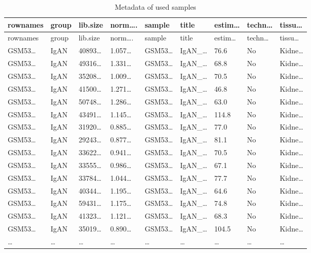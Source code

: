 \documentclass[
]{article}
\begin{document}
\begin{longtable}[]{@{}lllllllll@{}}
\caption{\label{tab:metadata-of-used-samples}Metadata of used samples}\tabularnewline
\toprule
rownames & group & lib.size & norm\ldots. & sample & title & estim\ldots{} & techn\ldots{} & tissu\ldots{}\tabularnewline
\midrule
\endfirsthead
\toprule
rownames & group & lib.size & norm\ldots. & sample & title & estim\ldots{} & techn\ldots{} & tissu\ldots{}\tabularnewline
\midrule
\endhead
GSM53\ldots{} & IgAN & 40893\ldots{} & 1.057\ldots{} & GSM53\ldots{} & IgAN\_\ldots{} & 76.6 & No & Kidne\ldots{}\tabularnewline
GSM53\ldots{} & IgAN & 49316\ldots{} & 1.331\ldots{} & GSM53\ldots{} & IgAN\_\ldots{} & 68.8 & No & Kidne\ldots{}\tabularnewline
GSM53\ldots{} & IgAN & 35208\ldots{} & 1.009\ldots{} & GSM53\ldots{} & IgAN\_\ldots{} & 70.5 & No & Kidne\ldots{}\tabularnewline
GSM53\ldots{} & IgAN & 41500\ldots{} & 1.271\ldots{} & GSM53\ldots{} & IgAN\_\ldots{} & 46.8 & No & Kidne\ldots{}\tabularnewline
GSM53\ldots{} & IgAN & 50748\ldots{} & 1.286\ldots{} & GSM53\ldots{} & IgAN\_\ldots{} & 63.0 & No & Kidne\ldots{}\tabularnewline
GSM53\ldots{} & IgAN & 43491\ldots{} & 1.145\ldots{} & GSM53\ldots{} & IgAN\_\ldots{} & 114.8 & No & Kidne\ldots{}\tabularnewline
GSM53\ldots{} & IgAN & 31920\ldots{} & 0.885\ldots{} & GSM53\ldots{} & IgAN\_\ldots{} & 77.0 & No & Kidne\ldots{}\tabularnewline
GSM53\ldots{} & IgAN & 29243\ldots{} & 0.877\ldots{} & GSM53\ldots{} & IgAN\_\ldots{} & 81.1 & No & Kidne\ldots{}\tabularnewline
GSM53\ldots{} & IgAN & 33622\ldots{} & 0.941\ldots{} & GSM53\ldots{} & IgAN\_\ldots{} & 70.5 & No & Kidne\ldots{}\tabularnewline
GSM53\ldots{} & IgAN & 33555\ldots{} & 0.986\ldots{} & GSM53\ldots{} & IgAN\_\ldots{} & 67.1 & No & Kidne\ldots{}\tabularnewline
GSM53\ldots{} & IgAN & 33784\ldots{} & 1.044\ldots{} & GSM53\ldots{} & IgAN\_\ldots{} & 77.7 & No & Kidne\ldots{}\tabularnewline
GSM53\ldots{} & IgAN & 40344\ldots{} & 1.195\ldots{} & GSM53\ldots{} & IgAN\_\ldots{} & 64.6 & No & Kidne\ldots{}\tabularnewline
GSM53\ldots{} & IgAN & 59431\ldots{} & 1.175\ldots{} & GSM53\ldots{} & IgAN\_\ldots{} & 74.8 & No & Kidne\ldots{}\tabularnewline
GSM53\ldots{} & IgAN & 41323\ldots{} & 1.121\ldots{} & GSM53\ldots{} & IgAN\_\ldots{} & 68.3 & No & Kidne\ldots{}\tabularnewline
GSM53\ldots{} & IgAN & 35019\ldots{} & 0.890\ldots{} & GSM53\ldots{} & IgAN\_\ldots{} & 104.5 & No & Kidne\ldots{}\tabularnewline
\ldots{} & \ldots{} & \ldots{} & \ldots{} & \ldots{} & \ldots{} & \ldots{} & \ldots{} & \ldots{}\tabularnewline
\bottomrule
\end{longtable}
\end{document}
